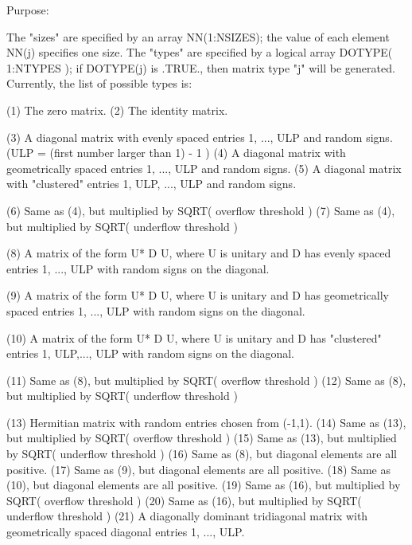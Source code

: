 \begin{DoxyParagraph}{Purpose\+: }
\begin{DoxyVerb}
 The "sizes" are specified by an array NN(1:NSIZES); the value of
 each element NN(j) specifies one size.
 The "types" are specified by a logical array DOTYPE( 1:NTYPES );
 if DOTYPE(j) is .TRUE., then matrix type "j" will be generated.
 Currently, the list of possible types is:

 (1)  The zero matrix.
 (2)  The identity matrix.

 (3)  A diagonal matrix with evenly spaced entries
      1, ..., ULP  and random signs.
      (ULP = (first number larger than 1) - 1 )
 (4)  A diagonal matrix with geometrically spaced entries
      1, ..., ULP  and random signs.
 (5)  A diagonal matrix with "clustered" entries 1, ULP, ..., ULP
      and random signs.

 (6)  Same as (4), but multiplied by SQRT( overflow threshold )
 (7)  Same as (4), but multiplied by SQRT( underflow threshold )

 (8)  A matrix of the form  U* D U, where U is unitary and
      D has evenly spaced entries 1, ..., ULP with random signs
      on the diagonal.

 (9)  A matrix of the form  U* D U, where U is unitary and
      D has geometrically spaced entries 1, ..., ULP with random
      signs on the diagonal.

 (10) A matrix of the form  U* D U, where U is unitary and
      D has "clustered" entries 1, ULP,..., ULP with random
      signs on the diagonal.

 (11) Same as (8), but multiplied by SQRT( overflow threshold )
 (12) Same as (8), but multiplied by SQRT( underflow threshold )

 (13) Hermitian matrix with random entries chosen from (-1,1).
 (14) Same as (13), but multiplied by SQRT( overflow threshold )
 (15) Same as (13), but multiplied by SQRT( underflow threshold )
 (16) Same as (8), but diagonal elements are all positive.
 (17) Same as (9), but diagonal elements are all positive.
 (18) Same as (10), but diagonal elements are all positive.
 (19) Same as (16), but multiplied by SQRT( overflow threshold )
 (20) Same as (16), but multiplied by SQRT( underflow threshold )
 (21) A diagonally dominant tridiagonal matrix with geometrically
      spaced diagonal entries 1, ..., ULP.\end{DoxyVerb}
 
\end{DoxyParagraph}

